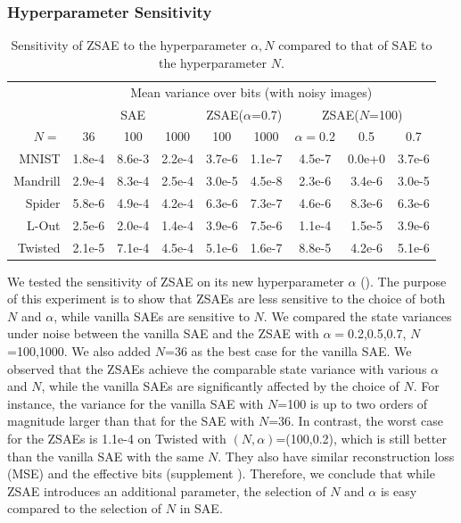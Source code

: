 \subsubsection{Hyperparameter Sensitivity}

\begin{table}[htb]
 \centering
 \begin{adjustbox}{width={\linewidth},keepaspectratio}
 \begin{tabular}{|r|*{8}{c|}}
     & \multicolumn{8}{c|}{Mean variance over bits (with noisy images)} \\
     & \multicolumn{3}{c|}{SAE} 
     & \multicolumn{2}{c|}{ZSAE($\alpha$=0.7)} 
     & \multicolumn{3}{c|}{ZSAE($N$=100)}
  \\
$N=$      &36     & 100    & 1000   & 100    & 1000   & $\alpha=$0.2 & 0.5    & 0.7    \\
MNIST     &1.8e-4 & 8.6e-3 & 2.2e-4 & 3.7e-6 & 1.1e-7 & 4.5e-7       & 0.0e+0 & 3.7e-6 \\
Mandrill  &2.9e-4 & 8.3e-4 & 2.5e-4 & 3.0e-5 & 4.5e-8 & 2.3e-6       & 3.4e-6 & 3.0e-5 \\
Spider    &5.8e-6 & 4.9e-4 & 4.2e-4 & 6.3e-6 & 7.3e-7 & 4.6e-6       & 8.3e-6 & 6.3e-6 \\
L-Out     &2.5e-6 & 2.0e-4 & 1.4e-4 & 3.9e-6 & 7.5e-6 & 1.1e-4       & 1.5e-5 & 3.9e-6 \\
Twisted   &2.1e-5 & 7.1e-4 & 4.5e-4 & 5.1e-6 & 1.6e-7 & 8.8e-5       & 4.2e-6 & 5.1e-6 \\
\end{tabular}
\end{adjustbox}
 \caption{Sensitivity of ZSAE to the hyperparameter $\alpha,N$ compared to that of SAE to the hyperparameter $N$.}
 \label{sensitivity}
\end{table}

We tested the sensitivity of ZSAE on its new hyperparameter $\alpha$ ().
The purpose of this experiment is to show that ZSAEs are less sensitive to the choice of both $N$ and $\alpha$,
while vanilla SAEs are sensitive to $N$.
% 
We compared the state variances under noise
between the vanilla SAE and the ZSAE with $\alpha=$0.2,0.5,0.7, $N$=100,1000.
We also added $N$=36 as the best case for the vanilla SAE.
% 
We observed that the ZSAEs achieve the comparable state variance with various $\alpha$ and $N$,
while the vanilla SAEs are significantly affected by the choice of $N$.
For instance,
the variance for the vanilla SAE with $N$=100 is up to two orders of magnitude larger than that for the SAE with $N$=36.
In contrast,
the worst case for the ZSAEs is 1.1e-4 on Twisted with $(N,\alpha)$=(100,0.2),
which is still better than the vanilla SAE with the same $N$.
% 
They also have similar reconstruction loss (MSE) and the effective bits (supplement ).
Therefore, we conclude that while ZSAE introduces an additional parameter,
the selection of $N$ and $\alpha$ is easy compared to the selection of $N$ in SAE.

